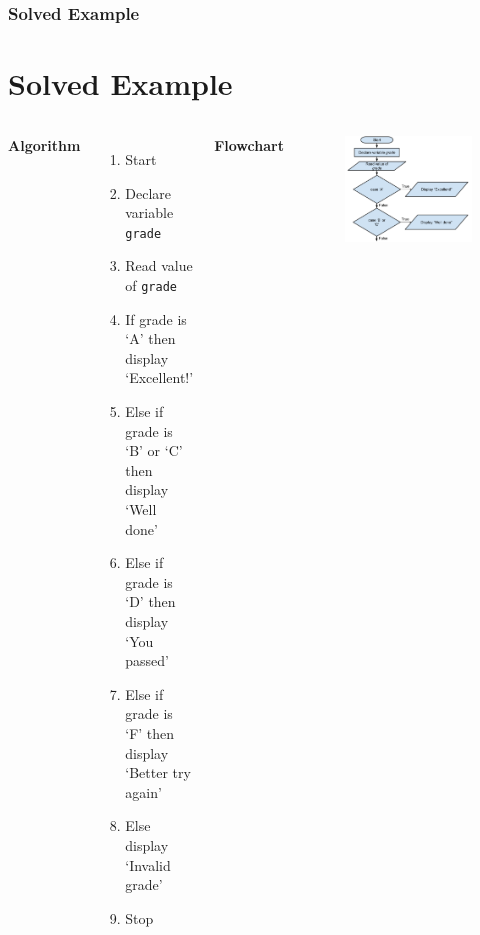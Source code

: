 \documentclass{beamer}
\begin{document}
\begin{frame}[fragile]
    \frametitle{Solved Example}
    \section{Solved Example} %
    \label{sec:solved_example}
    \begin{columns}
    \textbf{Algorithm}
    \begin{enumerate}
        \item Start
        \item Declare variable \texttt{grade}
        \item Read value of \texttt{grade}
        \item If grade is `A' then display `Excellent!'
        \item Else if grade is `B' or `C' then display `Well done'
        \item Else if grade is `D' then display `You passed'
        \item Else if grade is `F' then display `Better try again'
        \item Else display `Invalid grade'
        \item Stop
    \end{enumerate}
    \textbf{Flowchart}
    \begin{figure}
        \centering
        \includegraphics[scale=0.4]{pflow}
    \end{figure}
    \end{columns}
\end{frame}
\end{document}
